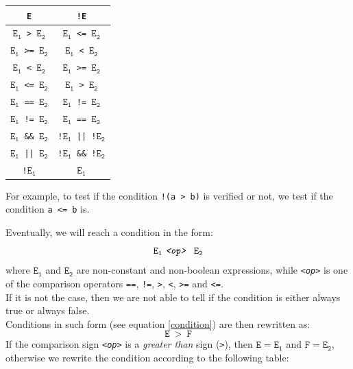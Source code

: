 \documentclass{article}
\begin{document}
\begin{table}[H]
\centering
\begin{tabular}{|c|c|}
\hline
\texttt{E} & \texttt{!E}      \\ \hline
\texttt{$\mathtt{E_1}$ > $\mathtt{E_2}$}   & \texttt{$\mathtt{E_1}$ <= $\mathtt{E_2}$} \\ \hline
\texttt{$\mathtt{E_1}$ >= $\mathtt{E_2}$}  & \texttt{$\mathtt{E_1}$ < $\mathtt{E_2}$}  \\ \hline
\texttt{$\mathtt{E_1}$ < $\mathtt{E_2}$}   & \texttt{$\mathtt{E_1}$ >= $\mathtt{E_2}$} \\ \hline
\texttt{$\mathtt{E_1}$ <= $\mathtt{E_2}$}  & \texttt{$\mathtt{E_1}$ > $\mathtt{E_2}$}  \\ \hline
\texttt{$\mathtt{E_1}$ == $\mathtt{E_2}$}  & \texttt{$\mathtt{E_1}$ != $\mathtt{E_2}$} \\ \hline
\texttt{$\mathtt{E_1}$ != $\mathtt{E_2}$}  & \texttt{$\mathtt{E_1}$ == $\mathtt{E_2}$} \\ \hline
\texttt{$\mathtt{E_1}$ \&\& $\mathtt{E_2}$}  & \texttt{!$\mathtt{E_1}$ || !$\mathtt{E_2}$} \\ \hline
\texttt{$\mathtt{E_1}$ || $\mathtt{E_2}$}  & \texttt{!$\mathtt{E_1}$ \&\& !$\mathtt{E_2}$} \\ \hline
\texttt{!$\mathtt{E_1}$}  & \texttt{$\mathtt{E_1}$} \\ \hline
\end{tabular}
\end{table}
\noindent
For example, to test if the condition \texttt{!(a > b)} is verified or not, we test if the condition \texttt{a <= b} is.

\smallskip
\noindent
Eventually, we will reach a condition in the form:
\begin{equation}
    \label{condition}
    \mathtt{E_1\ \text{\texttt{\textit{<op>}}}\ \ E_2}
\end{equation}
\noindent
where \texttt{$\mathtt{E_1}$} and \texttt{$\mathtt{E_2}$} are non-constant and non-boolean expressions, while \texttt{\textit{<op>}} is one of the comparison operators \texttt{==}, \texttt{!=}, \texttt{>}, \texttt{<}, \texttt{>=} and \texttt{<=}.
\\
If it is not the case, then we are not able to tell if the condition is either always true or always false.
\\
Conditions in such form (see equation \ref{condition}) are then rewritten as:
$$
\mathtt{E\ >\ F}
$$
\noindent
If the comparison sign \texttt{\textit{<op>}} is a \textit{greater than} sign (\texttt{>}), then $\mathtt{E} = \mathtt{E_1}$ and $\mathtt{F}=\mathtt{E_2}$, otherwise we rewrite the condition according to the following table:
\end{document}
